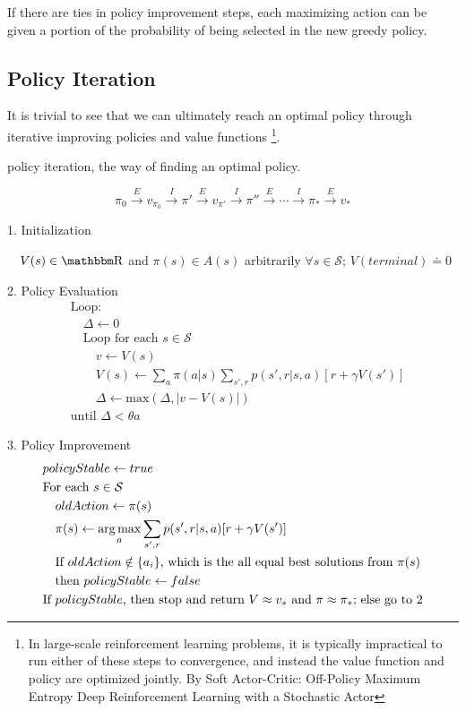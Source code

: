 \documentclass[sutton_barto_notes.tex]{subfiles}
\begin{document}
If there are ties in policy improvement steps, each maximizing action can be given a portion of the probability of being selected in the new greedy policy.

\subsection{Policy Iteration}

It is trivial to see that we can ultimately reach an optimal policy through iterative improving policies and value functions \footnote{In large-scale reinforcement learning problems, it is typically impractical to run either of these steps to convergence, and instead the value function and policy are optimized jointly. By Soft Actor-Critic: Off-Policy Maximum Entropy Deep Reinforcement Learning with a Stochastic Actor}.

\begin{definition}
policy iteration, the way of finding an optimal policy.

$$\pi_0 \xrightarrow{E} v_{\pi_0} \xrightarrow{I} \pi' \xrightarrow{E} v_{\pi'} \xrightarrow{I} \pi'' \xrightarrow{E} \cdots \xrightarrow{I} \pi_* \xrightarrow{E} v_* $$
\end{definition}

\begin{tcolorbox}[width=\textwidth,title={Policy Iteration (using iterative policy evaluation) for estimating $\pi \approx \pi_*$}]
1. Initialization

$\quad V(s) \in\R$ and $\pi(s) \in A(s)$ arbitrarily $\forall s \in \mathcal{S}$; $V(terminal) \doteq 0$

2. Policy Evaluation
\begin{align*}
&\text{Loop:}\\
&\quad\Delta \leftarrow 0\\
&\quad\text{Loop for each } s \in \mathcal{S}\\
&\quad\quad v \leftarrow V(s)\\
&\quad\quad V(s) \leftarrow \sum_a \pi (a|s) \sum_{s',r} p(s',r|s,a)[r + \gamma V(s')]\\
&\quad\quad \Delta \leftarrow \text{max}(\Delta, |v-V(s)|)\\
&\text{until } \Delta < \theta
a\end{align*}

3. Policy Improvement
\begin{align*}
&policyStable \leftarrow true\\
&\text{For each } s \in \mathcal{S}\\
&\quad oldAction \leftarrow \pi(s)\\
&\quad \pi(s) \leftarrow \operatorname*{arg\,max}_a \sum_{s',r} p(s',r|s,a)[r+\gamma V(s')]\\
&\quad \text{If } oldAction \notin \{a_i\} \text{, which is the all equal best solutions from $\pi(s)$}\\
& \quad \text{then } policyStable \leftarrow false\\
&\text{If } policyStable \text{, then stop and return } V \approx v_* \text{ and } \pi \approx \pi_*\text{; else go to 2}	
\end{align*}
\end{tcolorbox}
\end{document}
